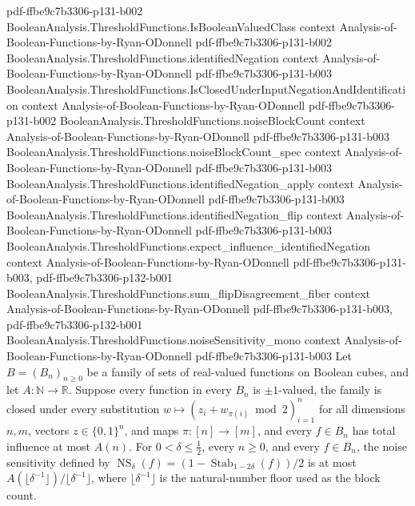 \begin{theorem}
  {pdf-ffbe9c7b3306-p131-b002}
\proofstep
  {BooleanAnalysis.ThresholdFunctions.IsBooleanValuedClass}
  {context}
  {Analysis-of-Boolean-Functions-by-Ryan-ODonnell}
  {pdf-ffbe9c7b3306-p131-b002}
\proofstep
  {BooleanAnalysis.ThresholdFunctions.identifiedNegation}
  {context}
  {Analysis-of-Boolean-Functions-by-Ryan-ODonnell}
  {pdf-ffbe9c7b3306-p131-b003}
\proofstep
  {BooleanAnalysis.ThresholdFunctions.IsClosedUnderInputNegationAndIdentification}
  {context}
  {Analysis-of-Boolean-Functions-by-Ryan-ODonnell}
  {pdf-ffbe9c7b3306-p131-b002}
\proofstep
  {BooleanAnalysis.ThresholdFunctions.noiseBlockCount}
  {context}
  {Analysis-of-Boolean-Functions-by-Ryan-ODonnell}
  {pdf-ffbe9c7b3306-p131-b003}
\proofstep
  {BooleanAnalysis.ThresholdFunctions.noiseBlockCount_spec}
  {context}
  {Analysis-of-Boolean-Functions-by-Ryan-ODonnell}
  {pdf-ffbe9c7b3306-p131-b003}
\proofstep
  {BooleanAnalysis.ThresholdFunctions.identifiedNegation_apply}
  {context}
  {Analysis-of-Boolean-Functions-by-Ryan-ODonnell}
  {pdf-ffbe9c7b3306-p131-b003}
\proofstep
  {BooleanAnalysis.ThresholdFunctions.identifiedNegation_flip}
  {context}
  {Analysis-of-Boolean-Functions-by-Ryan-ODonnell}
  {pdf-ffbe9c7b3306-p131-b003}
\proofstep
  {BooleanAnalysis.ThresholdFunctions.expect_influence_identifiedNegation}
  {context}
  {Analysis-of-Boolean-Functions-by-Ryan-ODonnell}
  {pdf-ffbe9c7b3306-p131-b003,
    pdf-ffbe9c7b3306-p132-b001}
\proofstep
  {BooleanAnalysis.ThresholdFunctions.sum_flipDisagreement_fiber}
  {context}
  {Analysis-of-Boolean-Functions-by-Ryan-ODonnell}
  {pdf-ffbe9c7b3306-p131-b003,
    pdf-ffbe9c7b3306-p132-b001}
\proofstep
  {BooleanAnalysis.ThresholdFunctions.noiseSensitivity_mono}
  {context}
  {Analysis-of-Boolean-Functions-by-Ryan-ODonnell}
  {pdf-ffbe9c7b3306-p131-b003}
Let $B=(B_n)_{n\ge0}$ be a family of sets of real-valued functions on Boolean cubes, and
let $A:\mathbb N\to\mathbb R$. Suppose every function in every $B_n$ is $\pm1$-valued,
the family is closed under every substitution $w\mapsto(z_i+w_{\pi(i)}\bmod 2)_{i=1}^n$
for all dimensions $n,m$, vectors $z\in\{0,1\}^n$, and maps $\pi:[n]\to[m]$, and every
$f\in B_n$ has total influence at most $A(n)$. For $0<\delta\le\tfrac12$, every $n\ge0$,
and every $f\in B_n$, the noise sensitivity defined by
$\operatorname{NS}_\delta(f)=(1-\operatorname{Stab}_{1-2\delta}(f))/2$ is at most
$A(\lfloor\delta^{-1}\rfloor)/\lfloor\delta^{-1}\rfloor$, where
$\lfloor\delta^{-1}\rfloor$ is the natural-number floor used as the block count.
\end{theorem}


